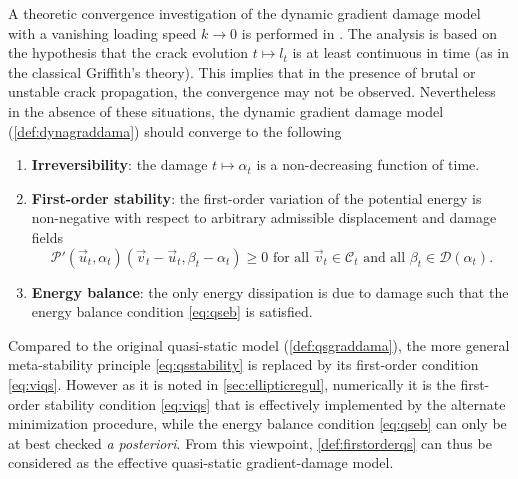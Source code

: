 A theoretic convergence investigation of the dynamic gradient damage model with a vanishing loading speed $k\to 0$ is performed in \cite{Versieux:2015}. The analysis is based on the hypothesis that the crack evolution $t\mapsto l_t$ is at least continuous in time (as in the classical Griffith's theory). This implies that in the presence of brutal or unstable crack propagation, the convergence may not be observed. Nevertheless in the absence of these situations, the dynamic gradient damage model (\cref{def:dynagraddama}) should converge to the following
\begin{definition} \label{def:firstorderqs} \noindent
\begin{enumerate}
\item \textbf{Irreversibility}: the damage $t\mapsto\alpha_t$ is a non-decreasing function of time.

\item \textbf{First-order stability}: the first-order variation of the potential energy is non-negative with respect to arbitrary admissible displacement and damage fields
\begin{equation} \label{eq:viqs}
\mathcal{P}'(\vec{u}_t,\alpha_t)(\vec{v}_t-\vec{u}_t,\beta_t-\alpha_t)\geq 0\text{ for all $\vec{v}_t\in\mathcal{C}_t$ and all $\beta_t\in\mathcal{D}(\alpha_t)$}.
\end{equation}

\item \textbf{Energy balance}: the only energy dissipation is due to damage such that the energy balance condition \eqref{eq:qseb} is satisfied.
\end{enumerate}
\end{definition}

Compared to the original quasi-static model (\cref{def:qsgraddama}),  the more general meta-stability principle \eqref{eq:qsstability} is replaced by its first-order condition \eqref{eq:viqs}. However as it is noted in \cref{sec:ellipticregul}, numerically it is the first-order stability condition \eqref{eq:viqs} that is effectively implemented by the alternate minimization procedure, while the energy balance condition \eqref{eq:qseb} can only be at best checked \emph{a posteriori}. From this viewpoint, \cref{def:firstorderqs} can thus be considered as the effective quasi-static gradient-damage model.

